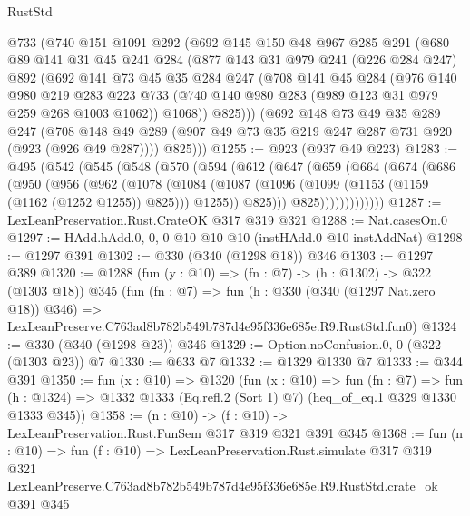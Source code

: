 \begin{lexlean}{RustStd}
\begin{coremodule}
    @733
    (@740
      @151
      @1091
      @292
      (@692
        @145
        @150
        @48
        @967
        @285
        @291
        (@680
          @89
          @141
          @31
          @45
          @241
          @284
          (@877
            @143
            @31
            @979
            @241
            (@226 @284 @247)
            @892
            (@692
              @141
              @73
              @45
              @35
              @284
              @247
              (@708
                @141
                @45
                @284
                (@976
                  @140
                  @980
                  @219
                  @283
                  @223
                  @733
                  (@740 @140 @980 @283 (@989 @123 @31 @979 @259 @268 @1003 @1062))
                  @1068))
              @825)))
        (@692
          @148
          @73
          @49
          @35
          @289
          @247
          (@708 @148 @49 @289 (@907 @49 @73 @35 @219 @247 @287 @731 @920 (@923 (@926 @49 @287))))
          @825)))
@1255 := @923 (@937 @49 @223)
@1283 := @495
    (@542
      (@545
        (@548
          (@570
            (@594
              (@612
                (@647
                  (@659
                    (@664
                      (@674
                        (@686
                          (@950
                            (@956
                              (@962
                                (@1078
                                  (@1084
                                    (@1087
                                      (@1096
                                        (@1099 (@1153 (@1159 (@1162 (@1252 @1255)) @825)))
                                        @1255))
                                    @825)))
                              @825)))))))))))))
@1287 := LexLeanPreservation.Rust.CrateOK @317 @319 @321
@1288 := Nat.casesOn.{0}
@1297 := HAdd.hAdd.{0, 0, 0} @10 @10 @10 (instHAdd.{0} @10 instAddNat)
@1298 := @1297 @391
@1302 := @330 (@340 (@1298 @18)) @346
@1303 := @1297 @389
@1320 := @1288
    (fun (y : @10) => (fn : @7) -> (h : @1302) -> @322 (@1303 @18))
    @345
    (fun (fn : @7) =>
    fun (h : @330 (@340 (@1297 Nat.zero @18)) @346) =>
    LexLeanPreserve.C763ad8b782b549b787d4e95f336e685e.R9.RustStd.fun0)
@1324 := @330 (@340 (@1298 @23)) @346
@1329 := Option.noConfusion.{0, 0} (@322 (@1303 @23)) @7
@1330 := @633 @7
@1332 := @1329 @1330 @7
@1333 := @344 @391
@1350 := fun (x : @10) =>
  @1320
    (fun (x : @10) =>
    fun (fn : @7) =>
    fun (h : @1324) => @1332 @1333 (Eq.refl.{2} (Sort 1) @7) (heq_of_eq.{1} @329 @1330 @1333 @345))
@1358 := (n : @10) -> (f : @10) -> LexLeanPreservation.Rust.FunSem @317 @319 @321 @391 @345
@1368 := fun (n : @10) =>
  fun (f : @10) =>
  LexLeanPreservation.Rust.simulate
    @317
    @319
    @321
    LexLeanPreserve.C763ad8b782b549b787d4e95f336e685e.R9.RustStd.crate_ok
    @391
    @345
\end{coremodule}
\end{lexlean}
